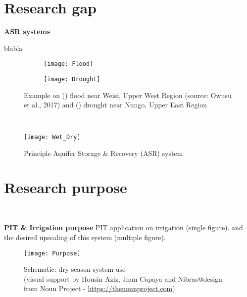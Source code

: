 \section{Research gap}
\textbf{ASR systems}


blabla
\begin{figure}[h!]
	\centering
	\begin{subfigure}[b]{0.5\linewidth}
		\centering\texttt{[image: Flood]}
		\captionsetup{justification=centering}		
		\caption{\label{fig:Flood}}
		\end{subfigure}%
	\begin{subfigure}[b]{0.5\linewidth}
        \centering\texttt{[image: Drought]}
		\captionsetup{justification=centering}		
		\caption{\label{fig:Drought}}
		\end{subfigure}
		\captionsetup{justification=centering}	
	\caption[Example on () flood near Weisi, Upper West Region and () drought near Nungo, Upper East Region]{Example on () flood near Weisi, Upper West Region (source: Owusu et al., 2017) and () drought near Nungo, Upper East Region} 
	\label{fig:Flood_Drought}
\end{figure} \\

\begin{figure}[h]
 \centering\texttt{[image: Wet\_Dry]}
 \captionsetup{justification=centering}
 \caption{Principle Aquifer Storage \& Recovery (ASR) system}
 \label{fig:ASR}
\end{figure}

\section{Research purpose}\

\textbf{PIT \& Irrigation purpose}
PIT application on irrigation (single figure). and the desired upscaling of this system (multiple figure). 

\begin{figure}[h]
 \centering\texttt{[image: Purpose]}
 \captionsetup{justification=centering}
 \caption[Schematic: dry season system use]{Schematic: dry season system use \\ (visual support by Housin Aziz, Jhun Capaya and Nibras@design from Noun Project - \url{https://thenounproject.com})}
 \label{fig:Purpose}
\end{figure}

